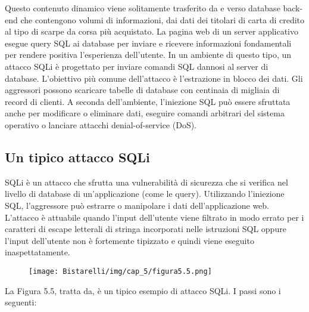\singlespacing

Questo contenuto dinamico viene solitamente trasferito da e verso database back-end che contengono volumi di informazioni, dai dati dei titolari di carta di credito al tipo di scarpe da corsa più acquistato. La pagina web di un server applicativo esegue query SQL ai database per inviare e ricevere informazioni fondamentali per rendere positiva l'esperienza dell'utente. In un ambiente di questo tipo, un attacco SQLi è progettato per inviare comandi SQL dannosi al server di database. L'obiettivo più comune dell'attacco è l'estrazione in blocco dei dati. Gli aggressori possono scaricare tabelle di database con centinaia di migliaia di record di clienti. A seconda dell'ambiente, l'iniezione SQL può essere sfruttata anche per modificare o eliminare dati, eseguire comandi arbitrari del sistema operativo o lanciare attacchi denial-of-service (DoS). 
\subsection{Un tipico attacco SQLi}
SQLi è un attacco che sfrutta una vulnerabilità di sicurezza che si verifica nel livello di database di un'applicazione (come le query). Utilizzando l'iniezione SQL, l'aggressore può estrarre o manipolare i dati dell'applicazione web.
L'attacco è attuabile quando l'input dell'utente viene filtrato in modo errato per i caratteri di escape letterali di stringa incorporati nelle istruzioni SQL oppure l'input dell'utente non è fortemente tipizzato e quindi viene eseguito inaspettatamente.

\begin{figure}[H]
	\centering
    \texttt{[image: Bistarelli/img/cap\_5/figura5.5.png]}
\end{figure}


La Figura 5.5, tratta da, è un tipico esempio di attacco SQLi. I passi sono i seguenti:

